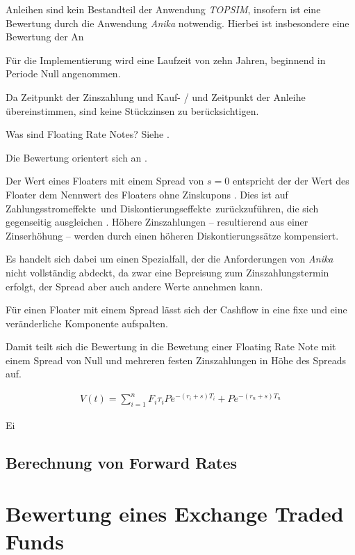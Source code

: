 \documentclass[12pt, a4paper]{article}
\begin{document}
Anleihen sind kein Bestandteil der Anwendung \textit{TOPSIM}, insofern ist eine Bewertung durch die Anwendung \textit{Anika} notwendig.
Hierbei ist insbesondere eine Bewertung der An

Für die Implementierung wird eine Laufzeit von zehn Jahren, beginnend in Periode Null angenommen.

Da Zeitpunkt der Zinszahlung und Kauf- / und Zeitpunkt der Anleihe übereinstimmen, sind keine Stückzinsen zu berücksichtigen.

Was sind Floating Rate Notes? Siehe \autocite[][]{fabozzi_fixed_2007}.

Die Bewertung orientert sich an \autocite[][]{veronesi_fixed_2010}.

Der Wert eines Floaters mit einem Spread von $s=0$ entspricht der der Wert des Floater dem Nennwert des Floaters ohne Zinskupons \autocite[][S.~52~f.]{veronesi_fixed_2010}. Dies ist auf \glqq Zahlungsstromeffekte\grqq~und \glqq Diskontierungseffekte\grqq~zurückzuführen, die sich gegenseitig ausgleichen \autocite[][S.~54]{veronesi_fixed_2010}. Höhere Zinszahlungen -- resultierend aus einer Zinserhöhung -- werden durch einen höheren Diskontierungssätze kompensiert.

Es handelt sich dabei um einen Spezialfall, der die Anforderungen von \textit{Anika} nicht vollständig abdeckt, da zwar eine Bepreisung zum Zinszahlungstermin erfolgt, der Spread aber auch andere Werte annehmen kann.

Für einen Floater mit einem Spread lässt sich der Cashflow in eine fixe und eine veränderliche Komponente aufspalten.

Damit teilt sich die Bewertung in die Bewetung einer Floating Rate Note mit einem Spread von Null und mehreren festen Zinszahlungen in Höhe des Spreads auf.


\begin{align}
	V(t)=\sum_{i=1}^{n} F_{i} \tau_{i} P e^{-\left(r_{i}+s\right) T_{i}}+P e^{-\left(r_{n}+s\right) T_{n}}
\end{align}


Ei

\subsection{Berechnung von Forward Rates}

\section{Bewertung eines Exchange Traded Funds}
\label{sec:bewertung_eines_exchange_traded_funds}
\end{document}
